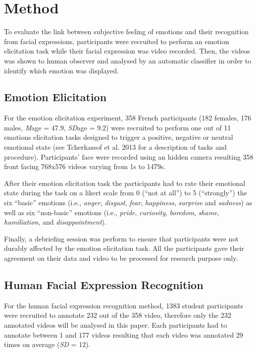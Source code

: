 \documentclass[conference,final,]{IEEEtran}
\begin{document}
\hypertarget{method}{%
\section{Method}\label{method}}

To evaluate the link between subjective feeling of emotions and their
recognition from facial expressions, participants were recruited to
perform an emotion elicitation task while their facial expression was
video recorded. Then, the videos was shown to human observer and
analysed by an automatic classifier in order to identify which emotion
was displayed.

\hypertarget{emotion-elicitation}{%
\subsection{Emotion Elicitation}\label{emotion-elicitation}}

For the emotion elicitation experiment, 358 French participants (182
females, 176 males, \emph{M}age = 47.9, \emph{SD}age = 9.2) were
recruited to perform one out of 11 emotions elicitation tasks designed
to trigger a positive, negative or neutral emotional state (see
Tcherkassof et al. 2013 for a description of tasks and procedure).
Participants' face were recorded using an hidden camera resulting 358
front facing 768x576 videos varying from 1s to 1479s.

After their emotion elicitation task the participants had to rate their
emotional state during the task on a likert scale from 0 (``not at
all'') to 5 (``strongly'') the six ``basic'' emotions (i.e.,
\emph{anger}, \emph{disgust}, \emph{fear}, \emph{happiness},
\emph{surprise} and \emph{sadness}) as well as six ``non-basic''
emotions (i.e., \emph{pride}, \emph{curiosity}, \emph{boredom},
\emph{shame}, \emph{humiliation}, and \emph{disappointment}).

Finally, a debriefing session was perform to ensure that participants
were not durably affected by the emotion elicitation task. All the
participants gave their agreement on their data and video to be
processed for research purpose only.

\hypertarget{human-facial-expression-recognition}{%
\subsection{Human Facial Expression
Recognition}\label{human-facial-expression-recognition}}

For the human facial expression recognition method, 1383 student
participants were recruited to annotate 232 out of the 358 video,
therefore only the 232 annotated videos will be analysed in this paper.
Each participants had to annotate between 1 and 177 videos resulting
that each video was annotated 29 times on average (\emph{SD} = 12).
\end{document}
